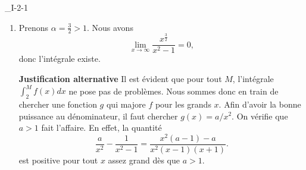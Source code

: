 \begin{corrige}{_I-2-1}
\begin{enumerate}
{\bf Justification alternative}
Prouvons que l'intégrale
\begin{equation}
	\int_2^{\infty}\frac{ \ln(x) }{ x^{1+\epsilon} }
\end{equation}
converge pour tout $\epsilon>0$. Pour tout $\alpha>0$, nous avons
\begin{equation}
	\lim_{x\to\infty}\frac{ \ln(x) }{ x^{\alpha} }=\lim_{x\to\infty}\frac{ 1/x }{ \alpha x^{\alpha-1} }=\lim_{x\to\infty}\frac{1}{ \alpha x^{\alpha} }=0,
\end{equation}
donc la fonction $x\mapsto \ln(x)/x^{\alpha}$ est bornée pour tout $\alpha >0$. Maintenant,
\begin{equation}
	\frac{ \ln(x) }{ x^{1+\epsilon} }=\frac{ \ln(x) }{ x^{\epsilon/2} }\cdot\frac{1}{ x^{1+\epsilon/2} }
\end{equation}
où le premier terme peut être majoré par une certaine constante $M$. Par conséquent,
\begin{equation}
	\frac{ \ln(x) }{ x^{1+\epsilon} }<M\frac{ 1 }{ x^{1+\epsilon/2} },
\end{equation}
dont le membre de droite a une intégrale qui converge sur $[2,\infty[$ pour tout $\epsilon>0$. Nous avons donc existence de l'intégrale lorsque $3/p >1$.

\item

Prenons $\alpha=\frac{ 3 }{ 2 }>1$. Nous avons
\begin{equation}
	\lim_{x\to\infty}\frac{ x^{\frac{ 3 }{ 2 }} }{ x^2-1 }=0,
\end{equation}
donc l'intégrale existe.

{\bf Justification alternative}
Il est évident que pour tout $M$, l'intégrale $\int_2^Mf(x)dx$ ne pose pas de problèmes. Nous sommes donc en train de chercher une fonction $g$ qui majore $f$ pour les grands $x$. Afin d'avoir la bonne puissance au dénominateur, il faut chercher $g(x)=a/x^2$. On vérifie que $a>1$ fait l'affaire. En effet, la quantité
\begin{equation}
	\frac{ a }{ x^2 }-\frac{ 1 }{ x^2-1 }=\frac{ x^2(a-1)-a }{ x^2(x-1)(x+1) }.
\end{equation}
est positive pour tout $x$ assez grand dès que $a>1$.

\end{enumerate}
\end{corrige}
